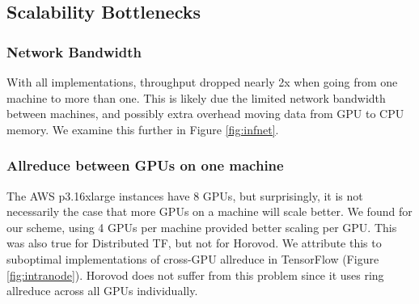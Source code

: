 \subsection{Scalability Bottlenecks}
\subsubsection{Network Bandwidth}
With all implementations, throughput dropped nearly 2x when going from one machine to more than one. This is likely due the limited network bandwidth between machines, and possibly extra overhead moving data from GPU to CPU memory. We examine this further in Figure \ref{fig:infnet}.

\subsubsection{Allreduce between GPUs on one machine}
The AWS p3.16xlarge instances have 8 GPUs, but surprisingly, it is not necessarily the case that more GPUs on a machine will scale better. We found for our scheme, using 4 GPUs per machine provided better scaling per GPU. This was also true for Distributed TF, but not for Horovod. We attribute this to suboptimal implementations of cross-GPU allreduce in TensorFlow (Figure \ref{fig:intranode}). Horovod does not suffer from this problem since it uses ring allreduce across all GPUs individually.
